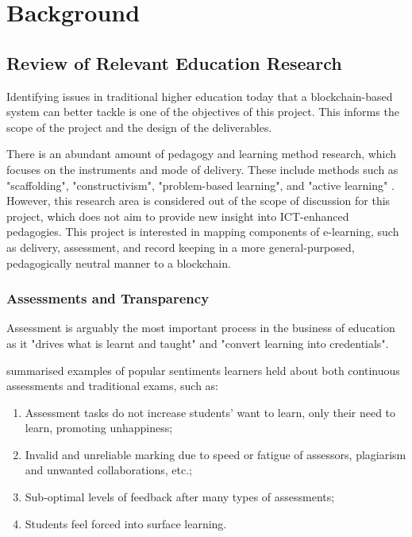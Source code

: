 
\chapter{Background}
    \graphicspath{{Chapter2/Figs/Raster/}{Chapter2/Figs/PDF/}{Chapter2/Figs/}}

\section{Review of Relevant Education Research}

Identifying issues in traditional higher education today that a blockchain-based system can better 
tackle is one of the objectives of this project. This informs the scope of the 
project and the design of the deliverables.

There is an abundant amount of pedagogy and learning method research, which focuses on the 
instruments and mode of delivery. These include methods such as "scaffolding", "constructivism", 
"problem-based learning", and "active learning" \citep{ali2005effective}. However, this 
research area is considered out of the scope of discussion for this project, which does not 
aim to provide new insight into ICT-enhanced pedagogies. This project is interested in 
mapping components of e-learning, such as delivery, assessment, and record keeping 
in a more general-purposed, pedagogically neutral manner to a blockchain.

\subsection{Assessments and Transparency}

Assessment is arguably the most important process in the business of education as it "drives what 
is learnt and taught" and "convert learning into credentials". \citep[p.160]{campbell2010digital}

\citet{brown1999assessment} summarised examples of popular sentiments learners held about both 
continuous assessments and traditional exams, such as:

\begin{enumerate}
    \setlength\itemsep{0em}
    \item Assessment tasks do not increase students' want to learn, only their need to learn, promoting unhappiness;
    \item Invalid and unreliable marking due to speed or fatigue of assessors, plagiarism and unwanted collaborations, etc.;
    \item Sub-optimal levels of feedback after many types of assessments;
    \item Students feel forced into surface learning.\\
    \citep[p.62-65]{brown1999assessment}
\end{enumerate}


